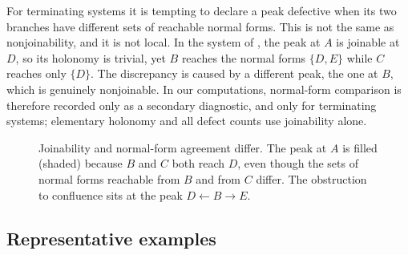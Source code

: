 \begin{remark}
\label{rem:holonomy-vs-formal-core}
For terminating systems it is tempting to declare a peak defective when its two branches have different sets of reachable normal forms. This is not the same as nonjoinability, and it is not local. In the system of , the peak at $A$ is joinable at $D$, so its holonomy is trivial, yet $B$ reaches the normal forms $\{D,E\}$ while $C$ reaches only $\{D\}$. The discrepancy is caused by a different peak, the one at $B$, which is genuinely nonjoinable. In our computations, normal-form comparison is therefore recorded only as a secondary diagnostic, and only for terminating systems; elementary holonomy and all defect counts use joinability alone.
\end{remark}

\begin{figure}[t]
\centering
{}
\caption{Joinability and normal-form agreement differ. The peak at $A$ is filled (shaded) because $B$ and $C$ both reach $D$, even though the sets of normal forms reachable from $B$ and from $C$ differ. The obstruction to confluence sits at the peak $D \leftarrow B \to E$.}
\label{fig:nf-mismatch}
\end{figure}

\subsection{Representative examples}

